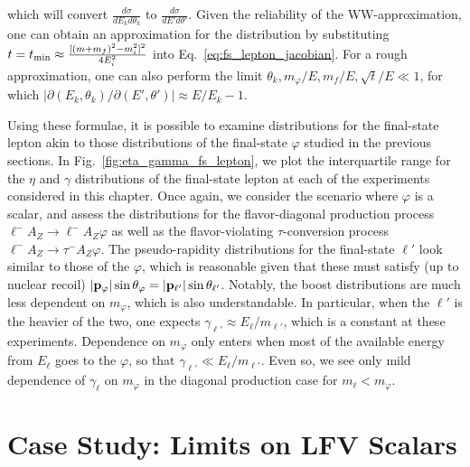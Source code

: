 which will convert $\frac{d\sigma}{dE_kd\theta_k}$ to $\frac{d\sigma}{dE'd\theta'}$. Given the reliability of the WW-approximation, one can obtain an approximation for the distribution by substituting $t = t_{\rm min} \approx \frac{[(m+m_f)^2 - m_i^2]^2}{4E_i^2}$ into Eq.~\ref{eq:fs_lepton_jacobian}. For a rough approximation, one can also perform the limit $\theta_k, m_\varphi/E, m_f/E, \sqrt{t}/E\ll 1$, for which $\left|\partial(E_k,\theta_k)/\partial(E',\theta')\right| \approx E/E_k - 1$. 

Using these formulae, it is possible to examine distributions for the final-state lepton akin to those distributions of the final-state $\varphi$ studied in the previous sections. In Fig.~\ref{fig:eta_gamma_fs_lepton}, we plot the interquartile range for the $\eta$ and $\gamma$ distributions of the final-state lepton at each of the experiments considered in this chapter. Once again, we consider the scenario where $\varphi$ is a scalar, and assess the distributions for the flavor-diagonal production process $\ell^- A_Z \rightarrow \ell^- A_Z \varphi$ as well as the flavor-violating $\tau$-conversion process $\ell^- A_Z \rightarrow \tau^- A_Z \varphi$. The pseudo-rapidity distributions for the final-state $\ell'$ look similar to those of the $\varphi$, which is reasonable given that these must satisfy (up to nuclear recoil) $|{\bf p}_\varphi|\sin{\theta_\varphi} = |{\bf p}_{\ell'}|\sin{\theta_{\ell'}}$. Notably, the boost distributions are much less dependent on $m_\varphi$, which is also understandable. In particular, when the $\ell'$ is the heavier of the two, one expects $\gamma_{\ell'} \approx E_\ell/m_{\ell'}$, which is a constant at these experiments. Dependence on $m_\varphi$ only enters when most of the available energy from $E_\ell$ goes to the $\varphi$, so that $\gamma_{\ell'} \ll E_\ell/m_{\ell'}$. Even so, we see only mild dependence of $\gamma_{\ell}$ on $m_\varphi$ in the diagonal production case for $m_{\ell} < m_\varphi$.

\section{Case Study: Limits on LFV Scalars}\label{sec:lfv_scalar_case_study}


